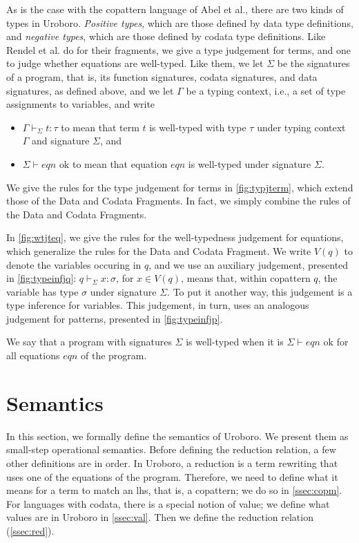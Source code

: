 As is the case with the copattern language of Abel et al.\cite{abel13copatterns}, there are two kinds of types in Uroboro. \textit{Positive types}, which are those defined by data type definitions, and \textit{negative types}, which are those defined by codata type definitions. Like Rendel et al. do for their fragments, we give a type judgement for terms, and one to judge whether equations are well-typed.  Like them, we let $\Sigma$ be the signatures of a program, that is, its function signatures, codata signatures, and data signatures, as defined above, and we let $\Gamma$ be a typing context, i.e., a set of type assignments to variables, and write
\begin{itemize}
\item $\Gamma \vdash_{\Sigma} t : \tau$ to mean that term $t$ is well-typed with type $\tau$ under typing context $\Gamma$ and signature $\Sigma$, and

\item $\Sigma \vdash eqn \textrm{ ok}$ to mean that equation $eqn$ is well-typed under signature $\Sigma$.
\end{itemize}
We give the rules for the type judgement for terms in \autoref{fig:typjterm}, which extend those of the Data and Codata Fragments. In fact, we simply combine the rules of the Data and Codata Fragments.

In \autoref{fig:wtjteq}, we give the rules for the well-typedness judgement for equations, which generalize the rules for the Data and Codata Fragment. We write $V(q)$ to denote the variables occuring in $q$, and we use an auxiliary judgement, presented in \autoref{fig:typeinfjq}: $q \vdash_{\Sigma} x : \sigma$, for $x \in V(q)$,  means that, within copattern $q$, the variable has type $\sigma$ under signature $\Sigma$. To put it another way, this judgement is a type inference for variables. This judgement, in turn, uses an analogous judgement for patterns, presented in \autoref{fig:typeinfjp}.

We say that a program with signatures $\Sigma$ is well-typed when it is $\Sigma \vdash eqn \textrm{ ok}$ for all equations $eqn$ of the program.

\section{Semantics}
\label{sec:urosos}

In this section, we formally define the semantics of Uroboro. We present them as small-step operational semantics. Before defining the reduction relation, a few other definitions are in order. In Uroboro, a reduction is a term rewriting that uses one of the equations of the program. Therefore, we need to define what it means for a term to match an lhs, that is, a copattern; we do so in \autoref{ssec:copm}. For languages with codata, there is a special notion of value; we define what values are in Uroboro in \autoref{ssec:val}. Then we define the reduction relation (\autoref{ssec:red}).

